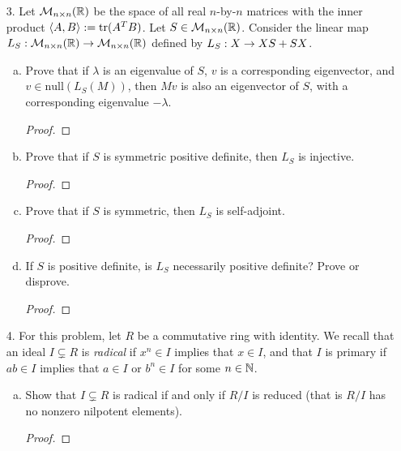 \begin{itemize}
\begin{enumerate}[(a)]
\begin{proof}
\end{proof}
\end{enumerate}









\item[3.] Let $\mathcal{M}_{n \times n}(\mathbb{R})$ be the space of all real $n$-by-$n$ matrices with the inner product
$\langle{}A,B\rangle := \text{tr}(A^{T} B)$. Let $S \in \mathcal{M}_{n \times n}(\mathbb{R})$. Consider the linear map $L_S : \mathcal{M}_{n \times n}(\mathbb{R}) \rightarrow \mathcal{M}_{n \times n}(\mathbb{R})$ defined by $L_S : X \rightarrow XS + SX$.
\begin{enumerate}[(a)]
\item Prove that if $\lambda$ is an eigenvalue of $S$, $v$ is a corresponding eigenvector, and $v \in \text{null}(L_S(M))$, then $Mv$ is also an eigenvector of $S$, with a corresponding eigenvalue $-\lambda$.
\begin{proof}

\end{proof}

\item Prove that if $S$ is symmetric positive definite, then $L_S$ is injective.
\begin{proof}

\end{proof}

\item Prove that if $S$ is symmetric, then $L_S$ is self-adjoint.
\begin{proof}

\end{proof}

\item If $S$ is positive definite, is $L_S$ necessarily positive definite? Prove or disprove.
\begin{proof}

\end{proof}
\end{enumerate}







\item[4.] For this problem, let $R$ be a commutative ring with identity. We recall that an
ideal $I \subsetneq R$  is \textit{radical} if $x^n \in I$ implies that $x \in I$, and that $I$ is primary if $ab \in I$ implies that $a \in I$ or $b^n \in I$ for some $n \in \mathbb{N}$.
\begin{enumerate}[(a)]
\item Show that $I \subsetneq R$ is radical if and only if $R/I$ is reduced (that is $R/I$
has no nonzero nilpotent elements).
\begin{proof}


\end{proof}
\end{enumerate}
\end{itemize}
